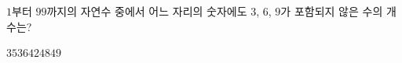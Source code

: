 \hspace*{2mm}\begin{minipage}[t]{\dimexpr\linewidth-2mm\relax}\vspace{0pt}
$1$부터 $99$까지의 자연수 중에서 어느 자리의 숫자에도 $3$, $6$, $9$가 포함되지 않은 수의 개수는?
\begin{choices32}{$35$}{$36$}{$42$}{$48$}{$49$}\end{choices32}\end{minipage}
